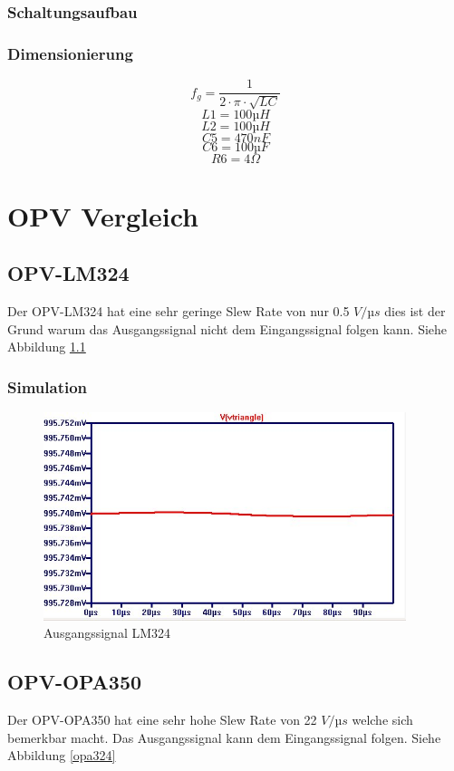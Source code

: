 \documentclass[11pt,a4paper,bibtotoc,oneside]{scrbook}
\begin{document}
\subsection{Schaltungsaufbau}

\subsection{Dimensionierung}
\[ f_g = \frac{1}{2\cdot\pi\cdot\sqrt{LC}}\]
\[L1 = 100µH\]
\[L2 = 100µH\]
\[C5 = 470nF\]
\[C6 = 100µF\]
\[R6 = 4\Omega\]
\chapter{OPV Vergleich}
\section{OPV-LM324}
Der OPV-LM324 hat eine sehr geringe Slew Rate von nur 0.5 $V/µs$ dies ist der Grund warum das Ausgangssignal nicht dem
Eingangssignal folgen kann. Siehe Abbildung \textcolor{blue}{\ref{lm324}}
\subsection{Simulation}
    \begin{figure}[h]
    \centering
        \includegraphics[width=300pt]{./picture/LM324_triangle.png}
        \caption{\label{lm324}{Ausgangssignal LM324}}
    \end{figure}
\section{OPV-OPA350}
Der OPV-OPA350 hat eine sehr hohe Slew Rate von 22 $V/µs$ welche sich bemerkbar macht. Das Ausgangssignal kann dem
Eingangssignal folgen. Siehe Abbildung \textcolor{blue}{\ref{opa324}}
\end{document}
